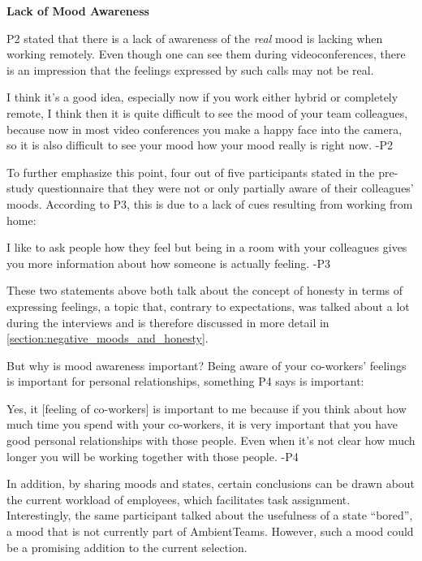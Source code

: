 \bigskip\noindent\textbf{Lack of Mood Awareness}

\medskip\noindent P2 stated that there is a lack of awareness of the \textit{real} mood is lacking when working remotely. Even though one can see them during videoconferences, there is an impression that the feelings expressed by such calls may not be real.

\begin{displayquote}
    I think it's a good idea, especially now if you work either hybrid or completely remote, I think then it is quite difficult to see the mood of your team colleagues, because now in most video conferences you make a happy face into the camera, so it is also difficult to see your mood how your mood really is right now. -P2
\end{displayquote}

To further emphasize this point, four out of five participants stated in the pre-study questionnaire that they were not or only partially aware of their colleagues' moods. According to P3, this is due to a lack of cues resulting from working from home:

\begin{displayquote}
    I like to ask people how they feel but being in a room with your colleagues gives you more information about how someone is actually feeling. -P3
\end{displayquote}

These two statements above both talk about the concept of honesty in terms of expressing feelings, a topic that, contrary to expectations, was talked about a lot during the interviews and is therefore discussed in more detail in \autoref{section:negative_moods_and_honesty}.

But why is mood awareness important? Being aware of your co-workers' feelings is important for personal relationships, something P4 says is important:

\begin{displayquote}
    Yes, it [feeling of co-workers] is important to me because if you think about how much time you spend with your co-workers, it is very important that you have good personal relationships with those people. Even when it's not clear how much longer you will be working together with those people. -P4
\end{displayquote}

In addition, by sharing moods and states, certain conclusions can be drawn about the current workload of employees, which facilitates task assignment. Interestingly, the same participant talked about the usefulness of a state \enquote{bored}, a mood that is not currently part of AmbientTeams. However, such a mood could be a promising addition to the current selection.

